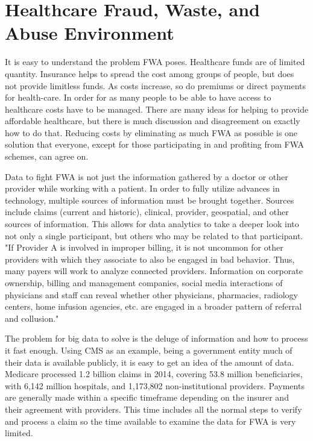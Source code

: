 \documentclass[sigconf]{acmart}
\begin{document}
\section{Healthcare Fraud, Waste, and Abuse Environment}

It is easy to understand the problem FWA poses.  Healthcare funds are of limited quantity.  Insurance helps to spread the cost among groups of people, but does not provide limitless funds.  As costs increase, so do premiums or direct payments for health-care.  In order for as many people to be able to have access to healthcare costs have to be managed.  There are many ideas for helping to provide affordable healthcare, but there is much discussion and disagreement on exactly how to do that.  Reducing costs by eliminating as much FWA as possible is one solution that everyone, except for those participating in and profiting from FWA schemes, can agree on.

Data to fight FWA is not just the information gathered by a doctor or other provider while working with a patient.  In order to fully utilize advances in technology, multiple sources of information must be brought together.  Sources include claims (current and historic), clinical, provider, geospatial, and other sources of information.  This allows for data analytics to take a deeper look into not only a single participant, but others who may be related to that participant.  "If Provider A is involved in improper billing, it is not uncommon for other providers with which they associate to also be engaged in bad behavior.  Thus, many payers will work to analyze connected providers.  Information on corporate ownership, billing and management companies, social media interactions of physicians and staff can reveal whether other physicians, pharmacies, radiology centers, home infusion agencies, etc. are engaged in a broader pattern of referral and collusion."\cite{RevCycle}

The problem for big data to solve is the deluge of information and how to process it fast enough.  Using CMS as an example, being a government entity much of their data is available publicly, it is easy to get an idea of the amount of data.  Medicare processed 1.2 billion claims in 2014, covering 53.8 million beneficiaries, with 6,142 million hospitals, and 1,173,802 non-institutional providers\cite{2015CMSStatistics}.  Payments are generally made within a specific timeframe depending on the insurer and their agreement with providers.  This time includes all the normal steps to verify and process a claim so the time available to examine the data for FWA is very limited.
\end{document}

